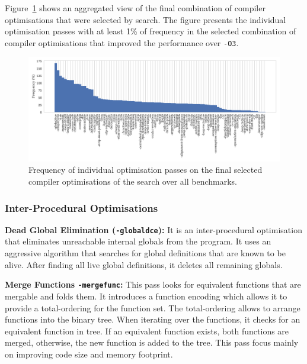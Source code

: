 Figure~\ref{fig:flagsfreq} shows an aggregated view of the final combination of compiler optimisations that were selected by {\itercomp} search.
The figure presents the individual optimisation passes with at least 1\% of frequency in the selected combination of compiler optimisations that improved the performance over {\texttt{-O3}}.

\begin{figure}[htb]
    \centering
    \includegraphics[width=\textwidth]{figs/flagsfreq.pdf}
    \caption{Frequency of individual optimisation passes on the final selected 
             compiler optimisations of the {\itercomp} search over
             all benchmarks.}
    \label{fig:flagsfreq}
\end{figure}

\subsubsection{Inter-Procedural Optimisations}
\noindent\textbf{Dead Global Elimination (\texttt{-globaldce}):}
It is an inter-procedural optimisation that eliminates unreachable internal globals from the program.
It uses an aggressive algorithm that searches for global definitions that are known to be alive.
After finding all live global definitions, it deletes all remaining globals.

\noindent\textbf{Merge Functions \texttt{-mergefunc}:}
This pass looks for equivalent functions that are mergable and folds them.
It introduces a function encoding which allows it to provide a total-ordering for the function set.
The total-ordering allows to arrange functions into the binary tree.
When iterating over the functions, it checks for an equivalent function in tree.
If an equivalent function exists, both functions are merged, otherwise, the new function is added to the tree.
This pass focus mainly on improving code size and memory footprint.

